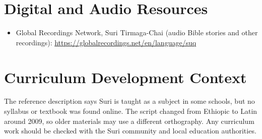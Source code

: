 \documentclass[12pt]{article}
\begin{document}
\section{Digital and Audio Resources}
\begin{itemize}
\item Global Recordings Network, Suri Tirmaga-Chai (audio Bible stories and other recordings): \url{https://globalrecordings.net/en/language/suq}
\end{itemize}

\section{Curriculum Development Context}
The reference description says Suri is taught as a subject in some schools, but no syllabus or textbook was found online. The script changed from Ethiopic to Latin around 2009, so older materials may use a different orthography. Any curriculum work should be checked with the Suri community and local education authorities.
\end{document}
